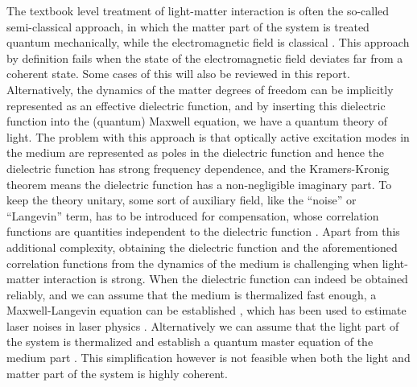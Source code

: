 \documentclass[hyperref, a4paper]{article}
\begin{document}
The textbook level treatment of light-matter interaction 
is often the so-called semi-classical approach,
in which the matter part of the system is treated quantum mechanically,
while the electromagnetic field is classical \cite{scully1997quantum}.
This approach by definition fails when the state of the electromagnetic field 
deviates far from a coherent state.
Some cases of this will also be reviewed in this report.
Alternatively, the dynamics of the matter degrees of freedom can be implicitly 
represented as an effective dielectric function,
and by inserting this dielectric function into the (quantum) Maxwell equation,
we have a quantum theory of light.
The problem with this approach is that optically active excitation modes in the medium 
are represented as poles in the dielectric function and 
hence the dielectric function has strong frequency dependence,
and the Kramers-Kronig theorem means the dielectric function has a non-negligible imaginary part.
To keep the theory unitary,
some sort of auxiliary field, like the ``noise'' or ``Langevin'' term, 
has to be introduced for compensation,
whose correlation functions are quantities independent to the dielectric function
\cite{huttner1992quantization,knoll2000qed,philbin2010canonical}. 
Apart from this additional complexity,
obtaining the dielectric function and the aforementioned correlation functions 
from the dynamics of the medium
is challenging when light-matter interaction is strong.
When the dielectric function can indeed be obtained reliably,
and we can assume that the medium is thermalized fast enough,
a Maxwell-Langevin equation can be established
\cite{henry1986theory,henry1986phase,amooghorban2013quantum},
which has been used to estimate laser noises in laser physics
\cite{henry1986theory,henry1986phase}.
Alternatively we can assume that the light part of the system is thermalized
and establish a quantum master equation of the medium part
\cite{scully1997quantum}.
This simplification however is not feasible when 
both the light and matter part of the system is highly coherent.
\end{document}
